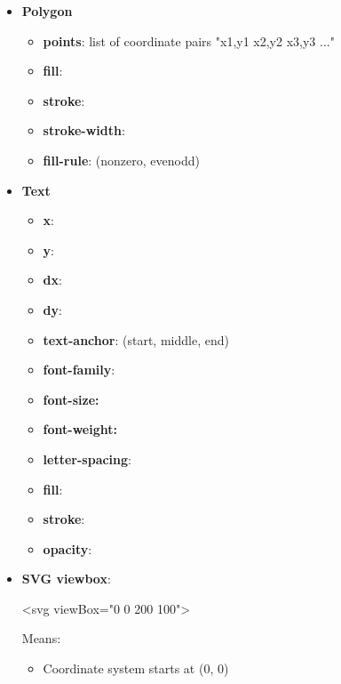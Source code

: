 \documentclass{report}
\begin{document}
\begin{itemize}
\begin{itemize}
                \item \textbf{stroke-width:}
                \item \textbf{stroke-linejoin}:
            \end{itemize}
        \item \textbf{Polygon}
            \begin{itemize}
                \item \textbf{points}:  list of coordinate pairs "x1,y1 x2,y2 x3,y3 ..."
                \item \textbf{fill}:
                \item \textbf{stroke}:
                \item \textbf{stroke-width}:
                \item \textbf{fill-rule}: (nonzero, evenodd)
            \end{itemize}
        \item \textbf{Text}
            \begin{itemize}
                \item \textbf{x}:
                \item \textbf{y}:
                \item \textbf{dx}:
                \item \textbf{dy}:
                \item \textbf{text-anchor}: (start, middle, end)
                \item \textbf{font-family}:
                \item \textbf{font-size:}
                \item \textbf{font-weight:}
                \item \textbf{letter-spacing}:
                \item \textbf{fill}:
                \item \textbf{stroke}:
                \item \textbf{opacity}:
            \end{itemize}
        \item \textbf{SVG viewbox}: 
            \bigbreak \noindent 
            \begin{htmlcode}
                <svg viewBox="0 0 200 100">
            \end{htmlcode}
            \bigbreak \noindent 
            Means:
            \begin{itemize}
                \item Coordinate system starts at (0, 0)

\end{itemize}
\end{itemize}
\end{document}

